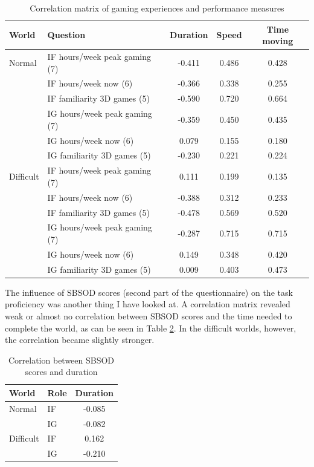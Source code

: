 \begin{table}[h!]
\centering
\begin{tabular}{llccc}
\toprule
World & Question  & Duration & Speed & Time moving  \\
\midrule
Normal 	& IF hours/week peak gaming (7) 	& -0.411 &	0.486 &	0.428\\
 		& IF hours/week now 	(6)			& -0.366	 & 	0.338 &	0.255\\
 		& IF familiarity 3D games (5)	& -0.590	 &	0.720 &	0.664\\
 		& IG hours/week peak gaming (7) 	& -0.359 &	0.450 &	0.435\\
 		& IG hours/week now 	(6)			& 0.079	 &	0.155 &	0.180\\
 		& IG familiarity 3D games (5)	& -0.230 &	0.221 &	0.224\\
\midrule
Difficult& IF hours/week peak gaming (7) & 0.111 &	0.199 &	0.135\\
 		& IF hours/week now (6)			& -0.388 &	0.312 &	0.233\\
 		& IF familiarity 3D games (5)	& -0.478 &	0.569 &	0.520\\
 		& IG hours/week peak gaming (7) 	& -0.287 &	0.715 &	0.715\\
 		& IG hours/week now (6)			& 0.149 &	0.348 &	0.420\\
 		& IG familiarity 3D games (5)	& 0.009 &	0.403 &	0.473\\
\bottomrule
\end{tabular}
\caption{Correlation matrix of gaming experiences and performance measures}
\label{tab:demfactors-gaming}
\end{table}

The influence of SBSOD scores (second part of the questionnaire) on the task proficiency was another thing I have looked at. A correlation matrix revealed weak or almost no correlation between SBSOD scores and the time needed to complete the world, as can be seen in Table \ref{tab:demfactors-sbsod}. In the difficult worlds, however, the correlation became slightly stronger.

\begin{table}[h!]
\centering
\begin{tabular}{llc}
\toprule
 World & Role   & Duration \\
\midrule
Normal & IF &	-0.085\\
 & IG &	-0.082\\
\midrule
Difficult & IF & 0.162\\
 & IG &	-0.210\\
\bottomrule
\end{tabular}
\caption{Correlation between SBSOD scores and duration}
\label{tab:demfactors-sbsod}
\end{table}

